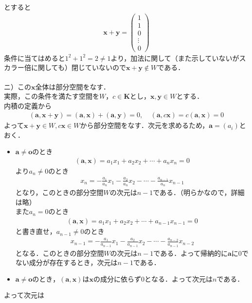 \documentclass[dvipdfmx,uplatex,11pt]{jsarticle}
\theoremstyle{definition}
\begin{document}
とすると
\begin{eqnarray*}
\bm{x}+\bm{y}=
\begin{pmatrix}
1 \\
1 \\
0 \\
\vdots \\
0
\end{pmatrix}
\end{eqnarray*}
条件に当てはめると$1^2+1^2=2 \neq 1$より，加法に関して（また示していないがスカラー倍に関しても）閉じていないので$\bm{x}+\bm{y} \not\in W$である．\\
\dotfill \\
ニ）この$\bm{x}全体$は部分空間をなす．$実際，この条件を満たす空間をW，c \in \bm{K}とし，\bm{x,y} \in W$とする．\\
内積の定義から
\begin{eqnarray*}
(\bm{a},\bm{x}+\bm{y})=(\bm{a},\bm{x})+(\bm{a},\bm{y})=0 ,~~~~~(\bm{a},c\bm{x})=c(\bm{a},\bm{x})=0
\end{eqnarray*}
よって$\bm{x}+\bm{y} \in W, c\bm{x} \in W$から部分空間をなす．次元を求めるため，$\bm{a}=(a_{i})$とおく．
\begin{itemize}
\item $\bm{a} \neq \bm{o}のとき$
\begin{eqnarray*}
(\bm{a},\bm{x})=a_1x_1+a_2x_2+ \cdots +a_nx_n=0
\end{eqnarray*}
より$a_n \neq 0$のとき
\begin{eqnarray*}
x_n=-\frac{a_1}{a_n}x_{1}-\frac{a_2}{a_n}x_{2}- \cdots -\frac{a_{n-1}}{a_n}x_{n-1}
\end{eqnarray*}
となり，このときの部分空間$Wの次元はn-1$である．（明らかなので，詳細は略）\\
また$a_n=0$のとき
\begin{eqnarray*}
(\bm{a},\bm{x})=a_1x_1+a_2x_2+ \cdots +a_{n-1}x_{n-1}=0
\end{eqnarray*}
と書き直せ，$a_{n-1} \neq 0$のとき
\begin{eqnarray*}
x_{n-1}=-\frac{a_1}{a_{n-1}}x_{1}-\frac{a_2}{a_{n-1}}x_{2}- \cdots -\frac{a_{n-2}}{a_{n-1}}x_{n-2}
\end{eqnarray*}
となる．このときの部分空間$Wの次元はn-1である．$よって帰納的に$\bm{a}$に0でない成分が存在するとき，次元は$n-1$である．\\
\item $\bm{a} \neq \bm{o}のとき，(\bm{a},\bm{x})は\bm{x}の成分に依らず0となる．よって次元はnである．$
\end{itemize}
よって次元は
\end{document}
